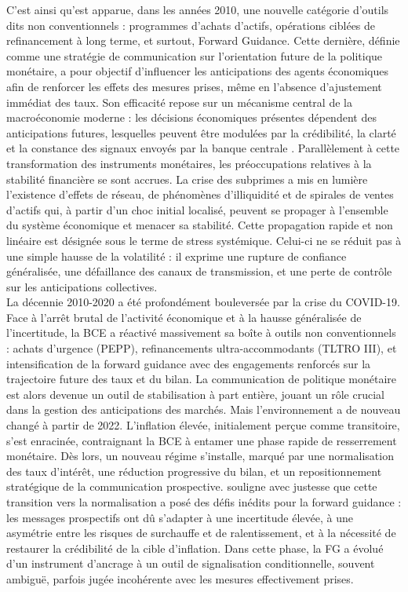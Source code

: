 C’est ainsi qu’est apparue, dans les années 2010, une nouvelle catégorie d’outils dits non conventionnels : programmes 
d’achats d’actifs, opérations ciblées de refinancement à long terme, et surtout, Forward Guidance. Cette dernière, 
définie comme une stratégie de communication sur l’orientation future de la politique monétaire, a pour objectif 
d’influencer les anticipations des agents économiques afin de renforcer les effets des mesures prises, même en 
l’absence d’ajustement immédiat des taux. Son efficacité repose sur un mécanisme central de la macroéconomie moderne : 
les décisions économiques présentes dépendent des anticipations futures, lesquelles peuvent être modulées par la 
crédibilité, la clarté et la constance des signaux envoyés par la banque centrale \citep{woodford2012}. 
Parallèlement à cette transformation des instruments monétaires, les préoccupations relatives à la stabilité 
financière se sont accrues. La crise des subprimes a mis en lumière l’existence d’effets de réseau, de phénomènes 
d’illiquidité et de spirales de ventes d’actifs qui, à partir d’un choc initial localisé, peuvent se propager à 
l’ensemble du système économique et menacer sa stabilité. Cette propagation rapide et non linéaire est désignée sous 
le terme de stress systémique. Celui-ci ne se réduit pas à une simple hausse de la volatilité : il exprime une rupture 
de confiance généralisée, une défaillance des canaux de transmission, et une perte de contrôle sur les anticipations 
collectives.\\

La décennie 2010-2020 a été profondément bouleversée par la crise du COVID-19. Face à l’arrêt brutal de l’activité économique et à la hausse généralisée de l’incertitude, la BCE a réactivé massivement sa boîte à outils non conventionnels : achats d’urgence (PEPP), refinancements ultra-accommodants (TLTRO III), et intensification de la forward guidance avec des engagements renforcés sur la trajectoire future des taux et du bilan. La communication de politique monétaire est alors devenue un outil de stabilisation à part entière, jouant un rôle crucial dans la gestion des anticipations des marchés. Mais l’environnement a de nouveau changé à partir de 2022. L’inflation élevée, initialement perçue comme transitoire, s’est enracinée, contraignant la BCE à entamer une phase rapide de resserrement monétaire. Dès lors, un nouveau régime s’installe, marqué par une normalisation des taux d’intérêt, une réduction progressive du bilan, et un repositionnement stratégique de la communication prospective. \citep{hofmann2024ecb} souligne avec justesse que cette transition vers la normalisation a posé des défis inédits pour la forward guidance : les messages prospectifs ont dû s’adapter à une incertitude élevée, à une asymétrie entre les risques de surchauffe et de ralentissement, et à la nécessité de restaurer la crédibilité de la cible d’inflation. Dans cette phase, la FG a évolué d’un instrument d’ancrage à un outil de signalisation conditionnelle, souvent ambiguë, parfois jugée incohérente avec les mesures effectivement prises.

